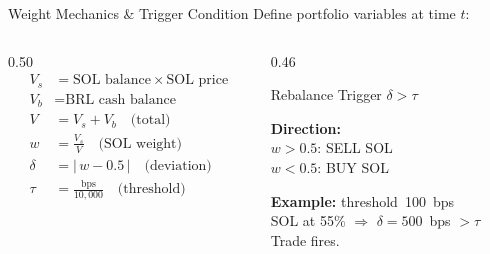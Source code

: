 \documentclass[aspectratio=169,10pt]{beamer}
\begin{document}
\begin{frame}{Weight Mechanics \& Trigger Condition}
\vspace{0.2em}
{\small\color{BodyText}Define portfolio variables at time $t$:}

\vspace{0.3em}
\small
\begin{columns}[T]
\begin{column}{0.50\textwidth}
\begin{align*}
  V_s &= \text{SOL balance} \times \text{SOL price} \\
  V_b &= \text{BRL cash balance} \\
  V   &= V_s + V_b \quad\text{(total)} \\[0.4em]
  w   &= \frac{V_s}{V} \quad\text{(SOL weight)} \\[0.4em]
  \delta &= |\,w - 0.5\,| \quad\text{(deviation)} \\[0.4em]
  \tau &= \frac{\text{bps}}{10{,}000} \quad\text{(threshold)}
\end{align*}
\end{column}
\begin{column}{0.46\textwidth}
\vspace{0.4cm}
\begin{block}{Rebalance Trigger}
\centering
$\delta > \tau$
\end{block}
\vspace{0.4em}
{\small\color{BodyText}
\textbf{Direction:}\\
$w > 0.5$: \textcolor{Danger}{SELL SOL}\\
$w < 0.5$: \textcolor{Success}{BUY SOL}

\vspace{0.3em}
\textbf{Example:} threshold~100~bps\\
SOL at 55\% $\Rightarrow$ $\delta = 500$~bps $> \tau$\\
Trade fires.
}
\end{column}
\end{columns}
\end{frame}
\end{document}
